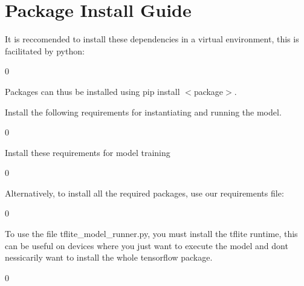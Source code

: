 \chapter{Package Install Guide }
\hypertarget{md_guides_2packages}{}\label{md_guides_2packages}
\label{md_guides_2packages_autotoc_md10}%
%


It is reccomended to install these dependencies in a virtual environment, this is facilitated by {\ttfamily python}:\+


\begin{DoxyCode}{0}

\end{DoxyCode}


Packages can thus be installed using {\ttfamily pip install \texorpdfstring{$<$}{<}package\texorpdfstring{$>$}{>}}.

Install the following requirements for instantiating and running the model.


\begin{DoxyCode}{0}

\end{DoxyCode}


Install these requirements for model training


\begin{DoxyCode}{0}

\end{DoxyCode}


Alternatively, to install all the required packages, use our requirements file:\+


\begin{DoxyCode}{0}

\end{DoxyCode}


To use the file {\ttfamily tflite\+\_\+model\+\_\+runner.\+py}, you must install the tflite runtime, this can be useful on devices where you just want to execute the model and don\textquotesingle{}t nessicarily want to install the whole tensorflow package.


\begin{DoxyCode}{0}

\end{DoxyCode}
 